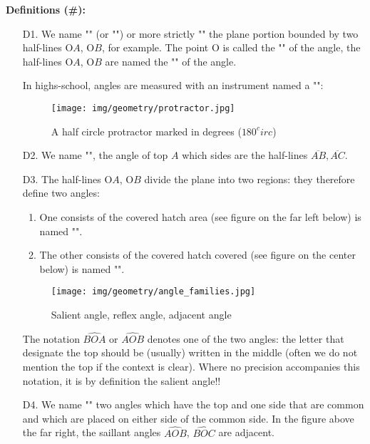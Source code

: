 	\textbf{Definitions (\#\mydef):}
	\begin{enumerate}
		\item[D1.] We name "" (or "") or more strictly "" the plane portion bounded by two half-lines O$A$, O$B$, for example. The point O is called the "" of the angle, the half-lines O$A$, O$B$ are named the "" of the angle.

		In highs-school, angles are measured with an instrument named a "":
		
		\begin{figure}[H]
			\centering
			\texttt{[image: img/geometry/protractor.jpg]}
			\caption{A half circle protractor marked in degrees ($180^circ$)}
		\end{figure}

		\item[D2.] We name "", the angle of top $A$ which sides are the half-lines $\overline{AB}, \overline{AC}$.

		\item[D3.] The half-lines O$A$, O$B$ divide the plane into two regions: they therefore define two angles:
		\begin{enumerate}
			\item One consists of the covered hatch area (see figure on the far left below) is named "".
	
			\item The other consists of the covered hatch covered (see figure on the center below) is named "".
		\end{enumerate}
		\begin{figure}[H]
			\centering
			\texttt{[image: img/geometry/angle\_families.jpg]}
			\caption{Salient angle, reflex angle, adjacent angle}
		\end{figure}
		The notation $\widehat{BOA}$ or $\widehat{AOB}$ denotes one of the two angles: the letter that designate the top should be (usually) written in the middle (often we do not mention the top if the context is clear). Where no precision accompanies this notation, it is by definition the salient angle!!

		\item[D4.] We name "" two angles which have the top and one side that are common and which are placed on either side of the common side. In the figure above the far right, the saillant angles $\widehat{AOB}$, $\widehat{BOC}$ are adjacent.
		

\end{enumerate}
